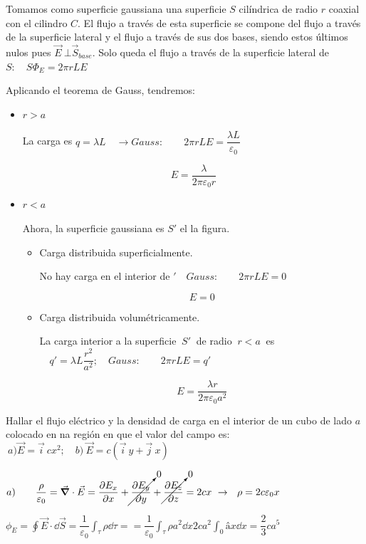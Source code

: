 Tomamos como superficie gaussiana una superficie $S$ cilíndrica de radio $r$ coaxial con el cilindro $C$. El flujo a través de esta superficie se compone del flujo a través de la superficie lateral y el flujo a través de sus dos bases, siendo estos últimos nulos pues $\vec E \ \bot \vec S_{base}$. Solo queda el flujo a través de la superficie lateral de $S:\quad S\Phi_E=2\pi r L E$

Aplicando el teorema de Gauss, tendremos:

\begin{itemize}
\item $r>a$

La carga es $q=\lambda L \quad \to Gauss: \qquad 2\pi rL E=\dfrac{\lambda L}{\varepsilon_0}$

$$E=\dfrac \lambda {2\pi \varepsilon_0 r}$$
\item $r<a$

Ahora, la superficie gaussiana es $S'$ el la figura.

	\begin{itemize}
	\item Carga distribuida superficialmente.
	
	No hay carga en el interior de $' \quad Gauss:\qquad 2\pi r L E=0$
	
	$$E=0$$
	\item Carga distribuida volumétricamente.
	
	La carga interior a la superficie $\ S' \ $ de radio $\ r<a\ $ es $\quad q'=\lambda L \dfrac {r^2}{a^2}; \quad Gauss: \qquad 2\pi r L E=q'$
	
	$$E=\dfrac{\lambda r}{2 \pi \varepsilon_0 a^2}$$
	\end{itemize}	
\end{itemize}

\vspace{10mm} %
\begin{prob}
Hallar el flujo eléctrico y la densidad de carga	 en el interior de un cubo de lado $a$ colocado en na región en que el valor del campo es: $\ a) \vec E=\vec i\ cx^2; \quad b)\ \vec E=c(\vec i\ y+\vec j \ x)$
\end{prob}

$a)\qquad \displaystyle \dfrac {\rho}{\varepsilon_0}=\vec \grad \cdot \vec E=
\pdv{E_x}{x}+\cancelto{0}{\pdv{E_y}{y}}+\cancelto{0}{\pdv{E_z}{z}}=2cx \ \to \ \ \rho=2c\varepsilon_0 x$

$\phi_E= \displaystyle \oint \vec E \cdot \dd \vec S=\dfrac 1 {\varepsilon_0} \int_\tau \rho \dd \tau= =
\dfrac 1 {\varepsilon_0} \int_\tau \rho a^2 \dd x
 2ca^2 \int_0â x \dd x=\dfrac 2 3 c a^5$
 

